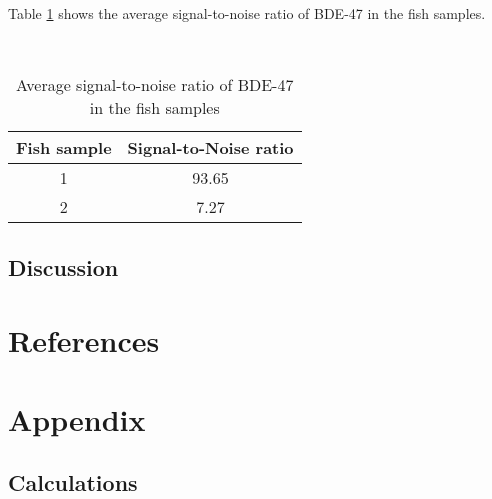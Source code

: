 \documentclass[a4paper, 12pt]{article}
\begin{document}
Table \ref{tab-sn} shows the average signal-to-noise ratio of BDE-47 in the fish samples.

\begin{table}[h!]
	\centering
	\caption{Average signal-to-noise ratio of BDE-47 in the fish samples}
	\hfill \\
	\begin{tabular}{|c|c|}
		\hline
		Fish sample & Signal-to-Noise ratio    \\ \hline
		1           & 93.65                    \\ \hline
		2           & 7.27                     \\ \hline
	\end{tabular}
	\label{tab-sn}
\end{table}



\subsection{Discussion}


\section{References}
\printbibliography


\section{Appendix}

\subsection{Calculations}
\end{document}
